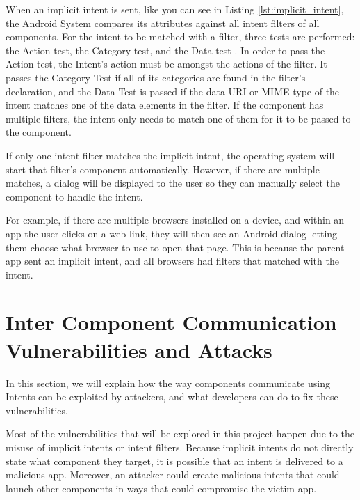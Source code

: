     
    
    When an implicit intent is sent, like you can see in Listing \ref{lst:implicit_intent}, the Android System compares its attributes against all intent filters of all components. For the intent to be matched with a filter, three tests are performed: the Action test, the Category test, and the Data test \cite{intents_and_intent_filters}. In order to pass the Action test, the Intent’s action must be amongst the actions of the filter. It passes the Category Test if all of its categories are found in the filter’s declaration, and the Data Test is passed if the data URI or MIME type of the intent matches one of the data elements in the filter. If the component has multiple filters, the intent only needs to match one of them for it to be passed to the component.
    
    
    
    If only one intent filter matches the implicit intent, the operating system will start that filter’s component automatically. However, if there are multiple matches, a dialog will be displayed to the user so they can manually select the component to handle the intent.
    
    For example, if there are multiple browsers installed on a device, and within an app the user clicks on a web link, they will then see an Android dialog letting them choose what browser to use to open that page. This is because the parent app sent an implicit intent, and all browsers had filters that matched with the intent.
    
    \section{Inter Component Communication Vulnerabilities and Attacks}
        \label{sec:icc_vulnerabilities_and_attacks}
        
    In this section, we will explain how the way components communicate using Intents can be exploited by attackers, and what developers can do to fix these vulnerabilities.
    
    Most of the vulnerabilities that will be explored in this project happen due to the misuse of implicit intents or intent filters. Because implicit intents do not directly state what component they target, it is possible that an intent is delivered to a malicious app. Moreover, an attacker could create malicious intents that could launch other components in ways that could compromise the victim app.
    
